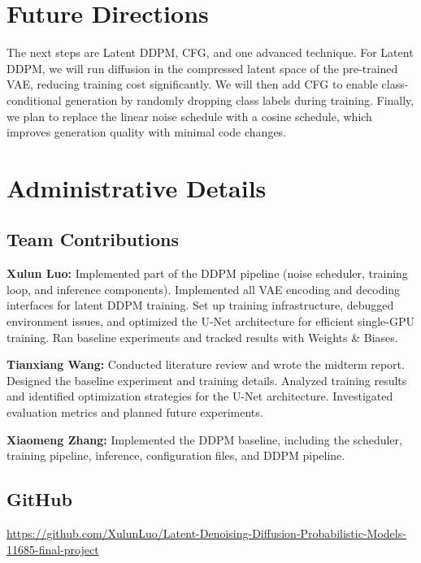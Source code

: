 \documentclass{article}
\begin{document}
\section{Future Directions}

The next steps are Latent DDPM, CFG, and one advanced technique.
For Latent DDPM, we will run diffusion in the compressed latent space of the
pre-trained VAE, reducing training cost significantly.
We will then add CFG to enable class-conditional generation by randomly
dropping class labels during training.
Finally, we plan to replace the linear noise schedule with a cosine schedule,
which improves generation quality with minimal code changes.

\section{Administrative Details}
\subsection{Team Contributions}

\textbf{Xulun Luo:} Implemented part of the DDPM pipeline (noise scheduler, training loop, and inference components). Implemented all VAE encoding and decoding interfaces for latent DDPM training. Set up training infrastructure, debugged environment issues, and optimized the U-Net architecture for efficient single-GPU training. Ran baseline experiments and tracked results with Weights \& Biases.

\textbf{Tianxiang Wang:} Conducted literature review and wrote the midterm report. Designed the baseline experiment and training details. Analyzed training results and identified optimization strategies for the U-Net architecture. Investigated evaluation metrics and planned future experiments.

\textbf{Xiaomeng Zhang:} Implemented the DDPM baseline, including the scheduler, training pipeline, inference, configuration files, and DDPM pipeline.

\subsection{GitHub}
\url{https://github.com/XulunLuo/Latent-Denoising-Diffusion-Probabilistic-Models-11685-final-project}



\small


\end{document}
